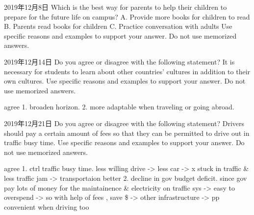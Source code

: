 2019年12月8日
Which is the best way for parents to help their children to prepare for the future life on campus?
A. Provide more books for children to read
B. Parents read books for children
C. Practice conversation with adults
Use specific reasons and examples to support your answer. Do not use memorized answers.


2019年12月14日
Do you agree or disagree with the following statement?
It is necessary for students to learn about other countries' cultures in addition to their own cultures.
Use specific reasons and examples to support your answer. Do not use memorized answers.

agree
1. broaden horizon.
2. more adaptable when traveling or going abroad.

2019年12月21日
Do you agree or disagree with the following statement?
Drivers should pay a certain amount of fees so that they can be permitted to drive out in traffic busy time.
Use specific reasons and examples to support your answer. Do not use memorized answers.

agree
1. ctrl traffic busy time. less willing drive -> less car -> x stuck in traffic & less traffic jam -> transportaion better
2. decline in gov budget deficit. since gov pay lots of money for the maintainence & electricity on traffic sys -> easy to overspend -> so with help of fees , save \$ -> other infrastructure -> pp convenient when driving too